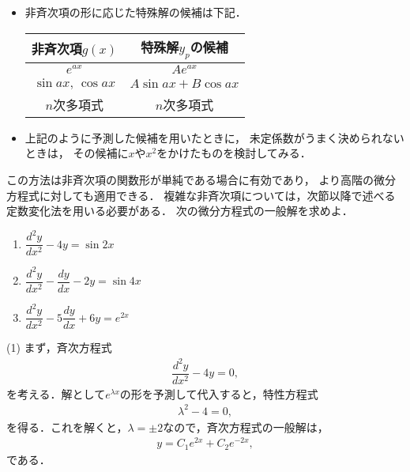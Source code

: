 \begin{itemize}
  \item 非斉次項の形に応じた特殊解の候補は下記． 
  \begin{table}[htbp]
  \centering
  \begin{tabular}{cc}
  \hline
  \hline
  非斉次項$g\left(x\right)$ & 特殊解$y_{p}$の候補\tabularnewline
  \hline 
  $e^{ax}$ & $Ae^{ax}$\tabularnewline
  $\sin ax,\,\cos ax$ & $A\sin ax+B\cos ax$\tabularnewline
  $n$次多項式 & $n$次多項式\tabularnewline
  \hline 
  \end{tabular}
  \end{table}
  \item 上記のように予測した候補を用いたときに，
	未定係数がうまく決められないときは，
	その候補に$x$や$x^2$をかけたものを検討してみる．
\end{itemize}
この方法は非斉次項の関数形が単純である場合に有効であり，
より高階の微分方程式に対しても適用できる．
複雑な非斉次項については，次節以降で述べる定数変化法を用いる必要がある．
%
\newpage
%
\gl
\reidai
次の微分方程式の一般解を求めよ．
\begin{enumerate}[(1)]
  \item $\dfrac{d^2 y}{dx^2} - 4y = \sin 2x$
  \item $\dfrac{d^2 y}{dx^2} - \dfrac{dy}{dx} - 2 y = \sin 4x$
  \item $\dfrac{d^2 y}{dx^2} -5\dfrac{dy}{dx} + 6 y = e^{2x}$ 
\end{enumerate}
\gl
\noindent
(1) まず，斉次方程式
\begin{align}
  \dfrac{d^2 y}{dx^2} - 4y = 0,
\end{align}
を考える．解として$e^{\lambda x}$の形を予測して代入すると，特性方程式
\begin{align}
  \lambda^2 - 4 = 0, 
\end{align}
を得る．これを解くと，$\lambda = \pm 2$なので，斉次方程式の一般解は，
\begin{align}
  y = C_1 e^{2x} + C_2 e^{-2x}, 
\end{align}
である．

